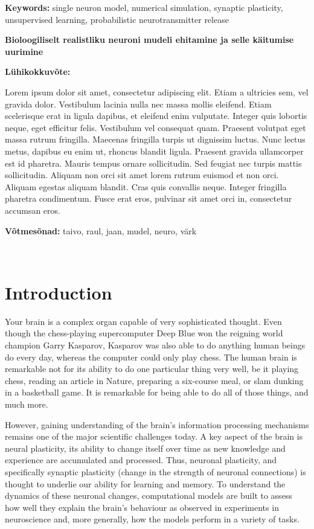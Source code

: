 \documentclass[a4paper,12pt]{report}
\theoremstyle{definition}
\newcommand{\thesistitleEST}{Bioloogiliselt realistliku neuroni mudeli ehitamine ja selle käitumise uurimine}
\begin{document}
\textbf{Keywords:} single neuron model, numerical simulation, synaptic plasticity, unsupervised learning, probabilistic neurotransmitter release

\vspace{1.5cm}



{\textbf
{\Large \thesistitleEST}}

\textbf{Lühikokkuvõte:}

Lorem ipsum dolor sit amet, consectetur adipiscing elit. Etiam a ultricies sem, vel gravida dolor. Vestibulum lacinia nulla nec massa mollis eleifend. Etiam scelerisque erat in ligula dapibus, et eleifend enim vulputate. Integer quis lobortis neque, eget efficitur felis. Vestibulum vel consequat quam. Praesent volutpat eget massa rutrum fringilla. Maecenas fringilla turpis ut dignissim luctus. Nunc lectus metus, dapibus eu enim ut, rhoncus blandit ligula. Praesent gravida ullamcorper est id pharetra. Mauris tempus ornare sollicitudin. Sed feugiat nec turpis mattis sollicitudin. Aliquam non orci sit amet lorem rutrum euismod et non orci. Aliquam egestas aliquam blandit. Cras quis convallis neque. Integer fringilla pharetra condimentum. Fusce erat eros, pulvinar sit amet orci in, consectetur accumsan eros.

\textbf{Võtmesõnad:} taivo, raul, jaan, mudel, neuro, värk


\
\thispagestyle{empty}
\pagebreak

\tableofcontents
\newpage



\chapter*{Introduction}


Your brain is a complex organ capable of very sophisticated thought. Even though the chess-playing supercomputer Deep Blue won the reigning world champion Garry Kasparov, Kasparov was also able to do anything human beings do every day, whereas the computer could only play chess. The human brain is remarkable not for its ability to do one particular thing very well, be it playing chess, reading an article in Nature, preparing a six-course meal, or slam dunking in a basketball game. It is remarkable for being able to do all of those things, and much more.

However, gaining understanding of the brain's information processing mechanisms remains one of the major scientific challenges today. A key aspect of the brain is neural plasticity, its ability to change itself over time as new knowledge and experience are accumulated and processed. Thus, neuronal plasticity, and specifically synaptic plasticity (change in the strength of neuronal connections) is thought to underlie our ability for learning and memory. To understand the dynamics of these neuronal changes, computational models are built to assess how well they explain the brain's behaviour as observed in experiments in neuroscience and, more generally, how the models perform in a variety of tasks.
\end{document}
